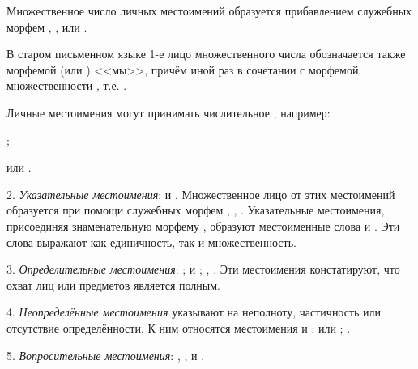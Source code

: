 Множественное число личных местоимений образуется прибавлением служебных морфем , ,  или .

В старом письменном языке 1-е лицо множественного числа обозначается также морфемой  (или ) <<мы>>, причём иной раз в сочетании с морфемой множественности , т.е. .

Личные местоимения могут принимать числительное , например:
\begin{prfsample}
    \item {};
    \item {} или .
\end{prfsample}

2. \emph{Указательные местоимения}:  и . Множественное лицо от этих местоимений образуется при помощи служебных морфем , , . Указательные местоимения, присоединяя знаменательную морфему , образуют местоименные слова  и . Эти слова выражают как единичность, так и множественность.

3. \emph{Определительные местоимения}: ;  и ; , . Эти местоимения констатируют, что охват лиц или предметов является полным.

4. \emph{Неопределённые местоимения} указывают на неполноту, частичность или отсутствие определённости. К ним относятся местоимения  и ;  или ; .

5. \emph{Вопросительные местоимения}:
, ,  и .

